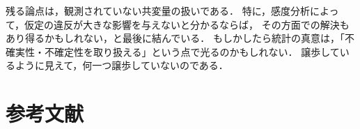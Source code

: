 \documentclass[uplatex,dvipdfmx]{jsreport}
\begin{document}
\begin{issue}
    残る論点は，観測されていない共変量の扱いである．
    特に，感度分析によって，仮定の違反が大きな影響を与えないと分かるならば，
    その方面での解決もあり得るかもしれない，と最後に結んでいる\cite{Cox-Wermuth04-review}．
    もしかしたら統計の真意は，「不確実性・不確定性を取り扱える」という点で光るのかもしれない．
    譲歩しているように見えて，何一つ譲歩していないのである．
\end{issue}

\chapter{参考文献}


\end{document}
